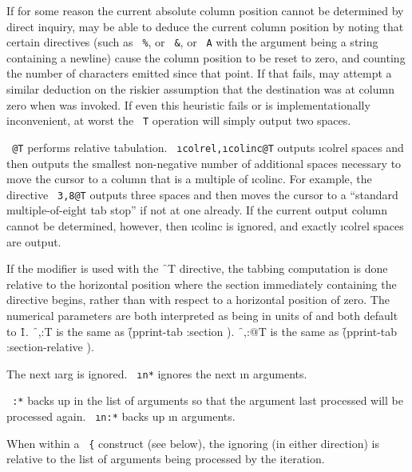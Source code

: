 If for some reason the current absolute column position cannot be determined
by direct inquiry,
may be able to deduce the current column position by noting         
that certain directives (such as {\tt ~\%}, or {\tt ~\&},
or {\tt ~A} 
with the argument being a string containing a newline) cause
the column position to be reset to zero, and counting the number of characters
emitted since that point.  If that fails,  
may attempt a
similar deduction on the riskier assumption that the destination was
at column zero when  
was invoked.  If even this heuristic fails
or is implementationally inconvenient, at worst
the {\tt ~T} operation will simply output two spaces.

{\tt ~@T} performs relative tabulation.
{\tt ~\i{colrel},\i{colinc}@T} outputs \i{colrel} spaces
and then outputs the smallest non-negative
number of additional spaces necessary to move the cursor
to a column that is a multiple                                       
of \i{colinc}.  For example, the directive 
{\tt ~3,8@T} outputs
three spaces and then moves the cursor to a ``standard multiple-of-eight
tab stop'' if not at one already.
If the current output column cannot be determined, however,
then \i{colinc} is ignored, and exactly \i{colrel} spaces are output.

If the  modifier is used with the \f{~T} directive,
the tabbing computation is done relative to the horizontal position where the
section immediately containing the directive begins, rather than with
respect to a horizontal position of zero.  The numerical parameters are
both interpreted as being in units of  and both default to \f{1}.
\f{~,:T} is the same as 
  \f{(pprint-tab :section  )}.
\f{~,:@T} is the same as
  \f{(pprint-tab :section-relative  )}.

\itemitem{\tt ~*}
                                                
The next \i{arg} is ignored.
{\tt ~\i{n}*} ignores the next \i{n} arguments.

{\tt ~:*} backs up in the list of
arguments so that the argument last processed will be processed again.
{\tt ~\i{n}:*} backs up \i{n} arguments.

When within a {\tt ~\{} construct
(see below), the ignoring (in either direction) is relative to the list
of arguments being processed by the iteration.

